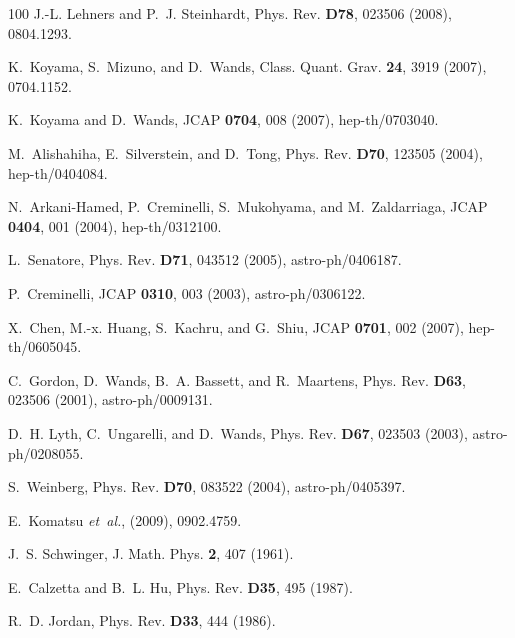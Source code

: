 \documentclass[12pt,letterpaper,rotate]{article}
\begin{document}
{\begin{thebibliography}{100}
J.-L. Lehners and P.~J. Steinhardt,
\newblock Phys. Rev. {\bf D78}, 023506 (2008), 0804.1293.

K.~Koyama, S.~Mizuno, and D.~Wands,
\newblock Class. Quant. Grav. {\bf 24}, 3919 (2007), 0704.1152.

K.~Koyama and D.~Wands,
\newblock JCAP {\bf 0704}, 008 (2007), hep-th/0703040.

M.~Alishahiha, E.~Silverstein, and D.~Tong,
\newblock Phys. Rev. {\bf D70}, 123505 (2004), hep-th/0404084.

N.~Arkani-Hamed, P.~Creminelli, S.~Mukohyama, and M.~Zaldarriaga,
\newblock JCAP {\bf 0404}, 001 (2004), hep-th/0312100.

L.~Senatore,
\newblock Phys. Rev. {\bf D71}, 043512 (2005), astro-ph/0406187.

P.~Creminelli,
\newblock JCAP {\bf 0310}, 003 (2003), astro-ph/0306122.

X.~Chen, M.-x. Huang, S.~Kachru, and G.~Shiu,
\newblock JCAP {\bf 0701}, 002 (2007), hep-th/0605045.

C.~Gordon, D.~Wands, B.~A. Bassett, and R.~Maartens,
\newblock Phys. Rev. {\bf D63}, 023506 (2001), astro-ph/0009131.

D.~H. Lyth, C.~Ungarelli, and D.~Wands,
\newblock Phys. Rev. {\bf D67}, 023503 (2003), astro-ph/0208055.

S.~Weinberg,
\newblock Phys. Rev. {\bf D70}, 083522 (2004), astro-ph/0405397.

E.~Komatsu {\em et~al.},
\newblock (2009), 0902.4759.

J.~S. Schwinger,
\newblock J. Math. Phys. {\bf 2}, 407 (1961).

E.~Calzetta and B.~L. Hu,
\newblock Phys. Rev. {\bf D35}, 495 (1987).

R.~D. Jordan,
\newblock Phys. Rev. {\bf D33}, 444 (1986).


\end{thebibliography}}
\end{document}
